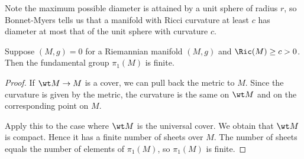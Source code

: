 Note the maximum possible diameter is attained by a unit sphere of radius $r$, so Bonnet-Myers tells us that a manifold with Ricci curvature at least $c$ has diameter at most that of the unit sphere with curvature $c$.

\begin{cor}
Suppose $(M,g)=0$ for a Riemannian manifold $(M,g)$ and $\Ric(M)\ge c>0$. Then the fundamental group $\pi_1(M)$ is finite.
\end{cor}
\begin{proof}
If $\wt M\to M$ is a cover, we can pull back the metric to $M$.  %
Since the curvature is given by the metric, the curvature is the same on $\wt M$ and on the corresponding point on $M$. 

Apply this to the case where $\wt M$ is the universal cover. We obtain that $\wt M$ is compact. Hence it has a finite number of sheets over $M$. The number of sheets equals the number of elements of $\pi_1(M)$, so $\pi_1(M)$ is finite.
\end{proof}

